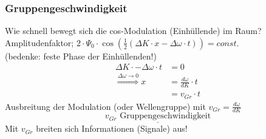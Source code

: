 \subsubsection{Gruppengeschwindigkeit}
Wie schnell bewegt sich die cos-Modulation (Einhüllende) im Raum?\\
Amplitudenfaktor; $ 2 \cdot \Psi_0 \cdot \cos(\frac{1}{2}(\Delta K \cdot x - \Delta\omega \cdot t)) = const.$\\
(bedenke: feste Phase der Einhüllenden!)\\
\begin{align*}
\Delta K \cdot - \Delta\omega\cdot t &= 0\\
\overset{\Delta\omega\rightarrow 0}{\Rightarrow} x &= \frac{d\omega}{dK} \cdot t\\
&= v_{Gr} \cdot t
\end{align*}
Ausbreitung der Modulation (oder Wellengruppe) mit $ v_{Gr} = \frac{d\omega}{dK} $\\
$$ \underline{v_{Gr} \text{ Gruppengeschwindigkeit}} $$
Mit $ v_{Gr} $ breiten sich Informationen (Signale) aus!
